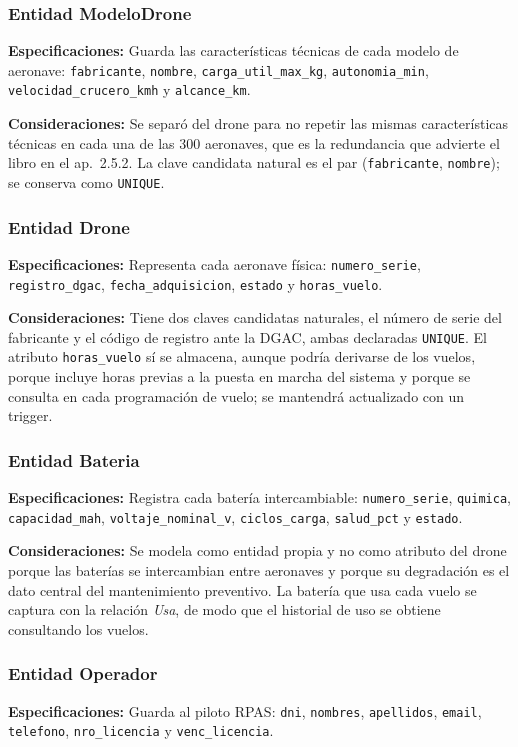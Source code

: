 \documentclass[11pt,a4paper]{article}
\newcommand{\at}[1]{\texttt{#1}}
\begin{document}
\subsubsection{Entidad ModeloDrone}
\textbf{Especificaciones:} Guarda las características técnicas de cada modelo de aeronave: \at{fabricante}, \at{nombre}, \at{carga\_util\_max\_kg}, \at{autonomia\_min}, \at{velocidad\_crucero\_kmh} y \at{alcance\_km}.

\textbf{Consideraciones:} Se separó del drone para no repetir las mismas características técnicas en cada una de las 300 aeronaves, que es la redundancia que advierte el libro en el ap.~2.5.2. La clave candidata natural es el par (\at{fabricante}, \at{nombre}); se conserva como \texttt{UNIQUE}.

\subsubsection{Entidad Drone}
\textbf{Especificaciones:} Representa cada aeronave física: \at{numero\_serie}, \at{registro\_dgac}, \at{fecha\_adquisicion}, \at{estado} y \at{horas\_vuelo}.

\textbf{Consideraciones:} Tiene dos claves candidatas naturales, el número de serie del fabricante y el código de registro ante la DGAC, ambas declaradas \texttt{UNIQUE}. El atributo \at{horas\_vuelo} sí se almacena, aunque podría derivarse de los vuelos, porque incluye horas previas a la puesta en marcha del sistema y porque se consulta en cada programación de vuelo; se mantendrá actualizado con un trigger.

\subsubsection{Entidad Bateria}
\textbf{Especificaciones:} Registra cada batería intercambiable: \at{numero\_serie}, \at{quimica}, \at{capacidad\_mah}, \at{voltaje\_nominal\_v}, \at{ciclos\_carga}, \at{salud\_pct} y \at{estado}.

\textbf{Consideraciones:} Se modela como entidad propia y no como atributo del drone porque las baterías se intercambian entre aeronaves y porque su degradación es el dato central del mantenimiento preventivo. La batería que usa cada vuelo se captura con la relación \textit{Usa}, de modo que el historial de uso se obtiene consultando los vuelos.

\subsubsection{Entidad Operador}
\textbf{Especificaciones:} Guarda al piloto RPAS: \at{dni}, \at{nombres}, \at{apellidos}, \at{email}, \at{telefono}, \at{nro\_licencia} y \at{venc\_licencia}.
\end{document}
